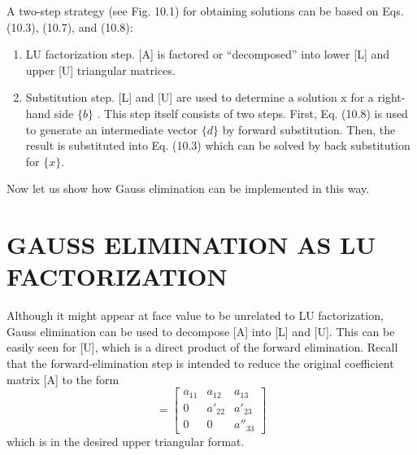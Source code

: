 \documentclass[../main.tex]{subfiles}
\begin{document}
A two-step strategy (see Fig. 10.1) for obtaining solutions can be based on Eqs. (10.3), (10.7), and (10.8):

\begin{enumerate}
\item LU factorization step. [A] is factored or “decomposed” into lower [L] and upper [U] triangular matrices.
\item Substitution step. [L] and [U] are used to determine a solution {x} for a right-hand side $\{b\}$ . This step itself consists of two steps. First, Eq. (10.8) is used to generate an intermediate vector $\{d\}$ by forward substitution. Then, the result is substituted into Eq. (10.3) which can be solved by back substitution for $\{x\}$.
\end{enumerate}
Now let us show how Gauss elimination can be implemented in this way.

\section{GAUSS ELIMINATION AS LU FACTORIZATION}

Although it might appear at face value to be unrelated to LU factorization, Gauss elimination can be used to decompose [A] into [L] and [U]. This can be easily seen for [U], which is a direct product of the forward elimination. Recall that the forward-elimination step is intended to reduce the original coefficient matrix [A] to the form
\begin{equation}
[U]=
\begin{bmatrix}
a_{11} &a_{12}  &a_{13} \\
0 &a'_{22}  &a'_{23} \\
0 &0  &a''_{33}
\end{bmatrix}\tag{10.9}
\end{equation}
which is in the desired upper triangular format.
\end{document}
